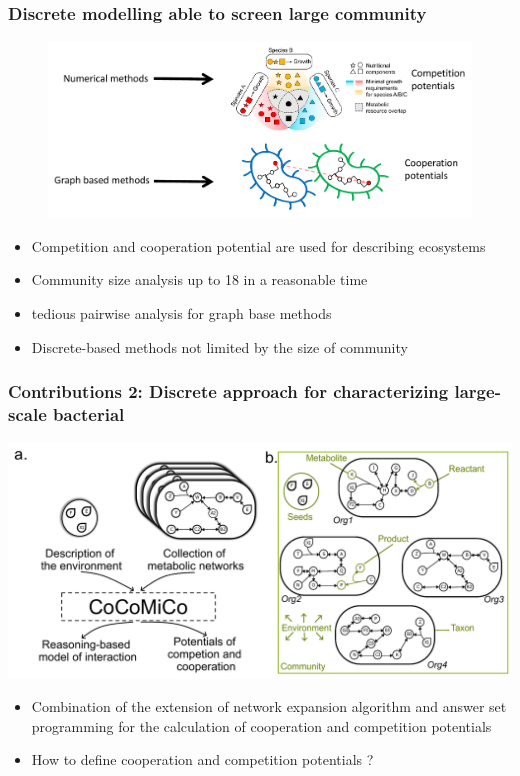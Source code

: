 \documentclass[8pt]{beamer}
\begin{document}
\begin{frame}
\frametitle{Discrete modelling able to screen large community}
\begin{figure}
\includegraphics[width=\textwidth]{figures/sota-discrete.pdf}
\end{figure}
\begin{block}{}
\begin{itemize}
\item Competition and cooperation potential are used for describing ecosystems
\item Community size analysis up to 18 \tiny \citep{Zelezniak2015} \normalsize in a reasonable time 
\item tedious pairwise analysis for graph base methods
\item Discrete-based methods not limited by the size of community
\end{itemize}
\end{block}
\end{frame}

\begin{frame}
\frametitle{Contributions 2: Discrete approach for characterizing large-scale bacterial}
\includegraphics[width=\textwidth]{figures/concept.pdf}
\begin{block}{}
\begin{itemize}
\item Combination of the extension of network expansion algorithm and answer set programming for the calculation of cooperation and competition potentials
\item How to define cooperation and competition potentials ?
\end{itemize}
\end{block}
\end{frame}
\end{document}
